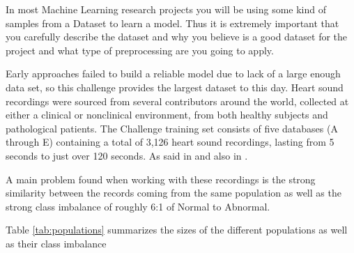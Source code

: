 \documentclass{project-logbook}
\begin{document}
{\begin{tip}
In most Machine Learning research projects you will be using some kind of samples from a Dataset to learn a model. Thus it is extremely important that you carefully describe the dataset and why you believe is a good dataset for the project and what type of preprocessing are you going to apply.
\end{tip}

Early approaches failed to build a reliable model due to lack of a large enough data set, so this challenge provides the largest dataset to this day. Heart sound recordings were sourced from several contributors around the world, collected at either a clinical or nonclinical environment, from both healthy subjects and pathological patients. The Challenge training set consists of five databases (A through E) containing a total of 3,126 heart sound recordings, lasting from 5 seconds to just over 120 seconds. As said in \cite{einstein} and also in \cite{knuth-fa}.

A main problem found when working with these recordings is the strong similarity between the records coming from the same population  as well as the strong class imbalance of roughly 6:1 of Normal to Abnormal.

Table \ref{tab:populations} summarizes the sizes of the different populations as well as their class imbalance


}
\end{document}
